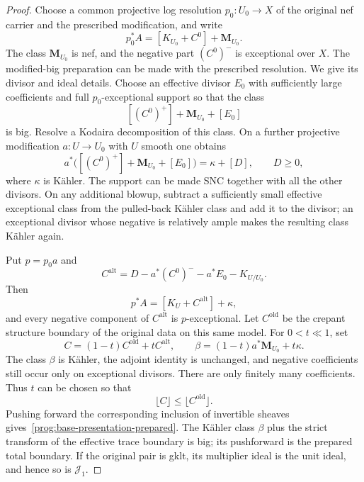 \begin{proof}
Choose a common projective log resolution $p_0:U_0\to X$ of the
original nef carrier and the prescribed modification, and write
\[
 p_0^*A=[K_{U_0}+C^0]+\mathbf M_{U_0}.
\]
The class $\mathbf M_{U_0}$ is nef, and the negative part $(C^0)^-$
is exceptional over $X$. The modified-big preparation
\cite[Lemmas~2.10 and~2.23]{HX} can be made with the prescribed
resolution. We give its divisor and ideal details. Choose an effective divisor $E_0$ with sufficiently large coefficients
and full $p_0$-exceptional support so that the class
\[
 [(C^0)^+]+\mathbf M_{U_0}+[E_0]
\]
is big. Resolve a Kodaira decomposition of this class. On a further
projective modification $a:U\to U_0$ with $U$ smooth one obtains
\[
 a^*\bigl([(C^0)^+]+\mathbf M_{U_0}+[E_0]\bigr)
       =\kappa+[D],\qquad D\geq0,
\]
where $\kappa$ is K\"ahler. The support can be made SNC together
with all the other divisors. On any additional blowup, subtract a
sufficiently small effective exceptional class from the pulled-back
K\"ahler class and add it to the divisor; an exceptional divisor
whose negative is relatively ample makes the resulting class
K\"ahler again.

Put $p=p_0a$ and
\[
 C^{\mathrm{alt}}=D-a^*(C^0)^--a^*E_0-K_{U/U_0}.
\]
Then
\[
 p^*A=[K_U+C^{\mathrm{alt}}]+\kappa,
\]
and every negative component of $C^{\mathrm{alt}}$ is
$p$-exceptional. Let $C^{\mathrm{old}}$ be the crepant structure
boundary of the original data on this same model. For $0<t\ll1$,
set
\[
 C=(1-t)C^{\mathrm{old}}+tC^{\mathrm{alt}},\qquad
 \beta=(1-t)a^*\mathbf M_{U_0}+t\kappa.
\]
The class $\beta$ is K\"ahler, the adjoint identity is unchanged,
and negative coefficients still occur only on exceptional divisors.
There are only finitely many coefficients. Thus $t$ can be chosen so
that
\[
 \lfloor C\rfloor\leq\lfloor C^{\mathrm{old}}\rfloor.
\]
Pushing forward the corresponding inclusion of invertible sheaves
gives~\eqref{prog:base-presentation-prepared}. The K\"ahler class
$\beta$ plus the strict transform of the effective trace boundary is
big; its pushforward is the prepared total boundary. If the original pair
is gklt, its multiplier ideal is the unit ideal, and hence so is
$\mathcal J_1$.
\end{proof}

